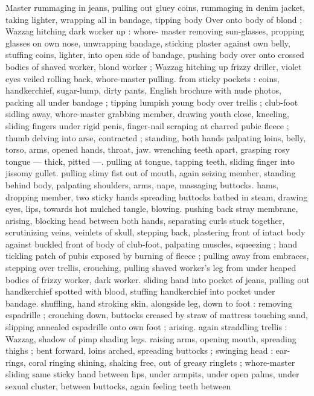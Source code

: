 Master rummaging in jeans, pulling out gluey coins, rummaging in 
denim jacket, taking lighter, wrapping all in bandage, tipping body 
Over onto body of blond ; Wazzag hitching dark worker up : whore- 
master removing sun-glasses, propping glasses on own nose, 
unwrapping bandage, sticking plaster against own belly, stuffing 
coins, lighter, into open side of bandage, pushing body over onto 
crossed bodies of shaved worker, blond worker ; Wazzag hitching up 
frizzy driller, violet eyes veiled rolling back, whore-master pulling. 
from sticky pockets : coins, handkerchief, sugar-lump, dirty pants, 
English brochure with nude photos, packing all under bandage ; 
tipping lumpish young body over trellis ; club-foot sidling away, 
whore-master grabbing member, drawing youth close, kneeling, 
sliding fingers under rigid penis, finger-nail scraping at charred 
pubic fleece ; thumb delving into arse, contracted ; standing, both 
hands palpating loins, belly, torso, arms, opened hands, throat, jaw. 
wrenching teeth apart, grasping rosy tongue --- thick, pitted ---. 
pulling at tongue, tapping teeth, sliding finger into jissomy gullet. 
pulling slimy fist out of mouth, again seizing member, standing 
behind body, palpating shoulders, arms, nape, massaging buttocks. 
hams, dropping member, two sticky hands spreading buttocks bathed 
in steam, drawing eyes, lips, towards hot mulched tangle, blowing. 
pushing back stray membrane, arising, blocking head between both 
hands, separating curls stuck together, scrutinizing veins, veinlets of 
skull, stepping back, plastering front of intact body against buckled 
front of body of club-foot, palpating muscles, squeezing ; hand 
tickling patch of pubis exposed by burning of fleece ; pulling away 
from embraces, stepping over trellis, crouching, pulling shaved 
worker's leg from under heaped bodies of frizzy worker, dark worker. 
sliding hand into pocket of jeans, pulling out handkerchief spotted 
with blood, stuffing handkerchief into pocket under bandage. 
shuffling, hand stroking skin, alongside leg, down to foot : removing 
espadrille ; crouching down, buttocks creased by straw of mattress 
touching sand, slipping annealed espadrille onto own foot ; arising. 
again straddling trellis : Wazzag, shadow of pimp shading legs. 
raising arms, opening mouth, spreading thighs ; bent forward, loins 
arched, spreading buttocks ; swinging head : ear-rings, coral ringing 
shining, shaking free, out of greasy ringlets ; whore-master sliding 
same sticky hand between lips, under armpits, under open palms, 
under sexual cluster, between buttocks, again feeling teeth between 
